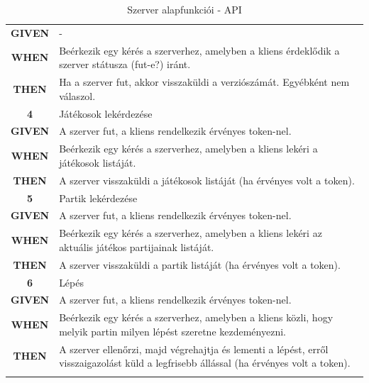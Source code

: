 \documentclass[twoside, a4paper, 12pt]{article}
\begin{document}
\begin{longtable}[c]{|c|p{14cm}|}
\textbf{GIVEN} &
-
\\ \nobreakhline

\textbf{WHEN} &
Beérkezik egy kérés a szerverhez, amelyben a kliens érdeklődik a szerver státusza (fut-e?) iránt.
\\
\nobreakhline

\textbf{THEN} &
Ha a szerver fut, akkor visszaküldi a verziószámát. Egyébként nem válaszol.
\\
\hline

\rowcolor[HTML]{CBCEFB} 
\textbf{4}
&	Játékosok lekérdezése
\\ \nobreakhline

\textbf{GIVEN} &
A szerver fut, a kliens rendelkezik érvényes token-nel.
\\ \nobreakhline

\textbf{WHEN} &
Beérkezik egy kérés a szerverhez, amelyben a kliens lekéri a játékosok listáját.
\\
\nobreakhline

\textbf{THEN} &
A szerver visszaküldi a játékosok listáját (ha érvényes volt a token).
\\
\hline

\rowcolor[HTML]{CBCEFB} 
\textbf{5}
&	Partik lekérdezése
\\ \nobreakhline

\textbf{GIVEN} &
A szerver fut, a kliens rendelkezik érvényes token-nel.
\\ \nobreakhline

\textbf{WHEN} &
Beérkezik egy kérés a szerverhez, amelyben a kliens lekéri az aktuális játékos partijainak listáját.
\\
\nobreakhline

\textbf{THEN} &
A szerver visszaküldi a partik listáját (ha érvényes volt a token).
\\
\hline

\rowcolor[HTML]{CBCEFB} 
\textbf{6}
&	Lépés
\\ \nobreakhline

\textbf{GIVEN} &
A szerver fut, a kliens rendelkezik érvényes token-nel.
\\ \nobreakhline

\textbf{WHEN} &
Beérkezik egy kérés a szerverhez, amelyben a kliens közli, hogy melyik partin milyen lépést szeretne kezdeményezni.
\\
\nobreakhline

\textbf{THEN} &
A szerver ellenőrzi, majd végrehajtja és lementi a lépést, erről visszaigazolást küld a legfrisebb állással (ha érvényes volt a token).
\\
\hline

\caption{Szerver alapfunkciói - API}
\label{userStories:server:api}\\
\end{longtable} 
\end{document}
